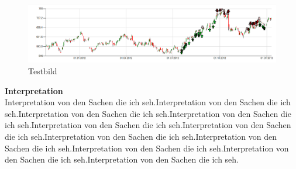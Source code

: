 \documentclass[11pt]{article} %
\begin{document}
\begin{figure}[h]
 \centering
  \includegraphics[width=1\textwidth]{images/Tests/test.png}
 \caption{Testbild}
 \label{fig:testbild}
\end{figure}

\textbf{Interpretation} \\
Interpretation von den Sachen die ich seh.Interpretation von den Sachen die ich seh.Interpretation von den Sachen die ich seh.Interpretation von den Sachen die ich seh.Interpretation von den Sachen die ich seh.Interpretation von den Sachen die ich seh.Interpretation von den Sachen die ich seh.Interpretation von den Sachen die ich seh.Interpretation von den Sachen die ich seh.Interpretation von den Sachen die ich seh.Interpretation von den Sachen die ich seh.
\newpage
\end{document}

